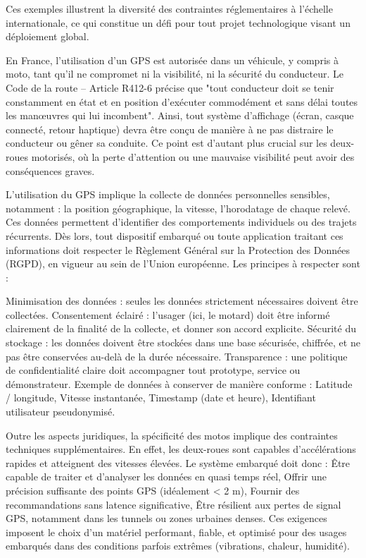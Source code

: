 Ces exemples illustrent la diversité des contraintes réglementaires à l’échelle internationale, ce qui constitue un défi pour tout projet technologique visant un déploiement global.

En France, l'utilisation d’un GPS est autorisée dans un véhicule, y compris à moto, tant qu’il ne compromet ni la visibilité, ni la sécurité du conducteur. Le Code de la route – Article R412-6 précise que "tout conducteur doit se tenir constamment en état et en position d'exécuter commodément et sans délai toutes les manœuvres qui lui incombent".
Ainsi, tout système d’affichage (écran, casque connecté, retour haptique) devra être conçu de manière à ne pas distraire le conducteur ou gêner sa conduite. Ce point est d’autant plus crucial sur les deux-roues motorisés, où la perte d’attention ou une mauvaise visibilité peut avoir des conséquences graves.

L'utilisation du GPS implique la collecte de données personnelles sensibles, notamment :
la position géographique,
la vitesse,
l’horodatage de chaque relevé.
Ces données permettent d’identifier des comportements individuels ou des trajets récurrents. Dès lors, tout dispositif embarqué ou toute application traitant ces informations doit respecter le Règlement Général sur la Protection des Données (RGPD), en vigueur au sein de l’Union européenne.
Les principes à respecter sont :

Minimisation des données : seules les données strictement nécessaires doivent être collectées.
Consentement éclairé : l’usager (ici, le motard) doit être informé clairement de la finalité de la collecte, et donner son accord explicite.
Sécurité du stockage : les données doivent être stockées dans une base sécurisée, chiffrée, et ne pas être conservées au-delà de la durée nécessaire.
Transparence : une politique de confidentialité claire doit accompagner tout prototype, service ou démonstrateur.
Exemple de données à conserver de manière conforme :
Latitude / longitude,
Vitesse instantanée,
Timestamp (date et heure),
Identifiant utilisateur pseudonymisé.

Outre les aspects juridiques, la spécificité des motos implique des contraintes techniques supplémentaires. En effet, les deux-roues sont capables d’accélérations rapides et atteignent des vitesses élevées. Le système embarqué doit donc :
Être capable de traiter et d’analyser les données en quasi temps réel,
Offrir une précision suffisante des points GPS (idéalement < 2 m),
Fournir des recommandations sans latence significative,
Être résilient aux pertes de signal GPS, notamment dans les tunnels ou zones urbaines denses.
Ces exigences imposent le choix d’un matériel performant, fiable, et optimisé pour des usages embarqués dans des conditions parfois extrêmes (vibrations, chaleur, humidité).

